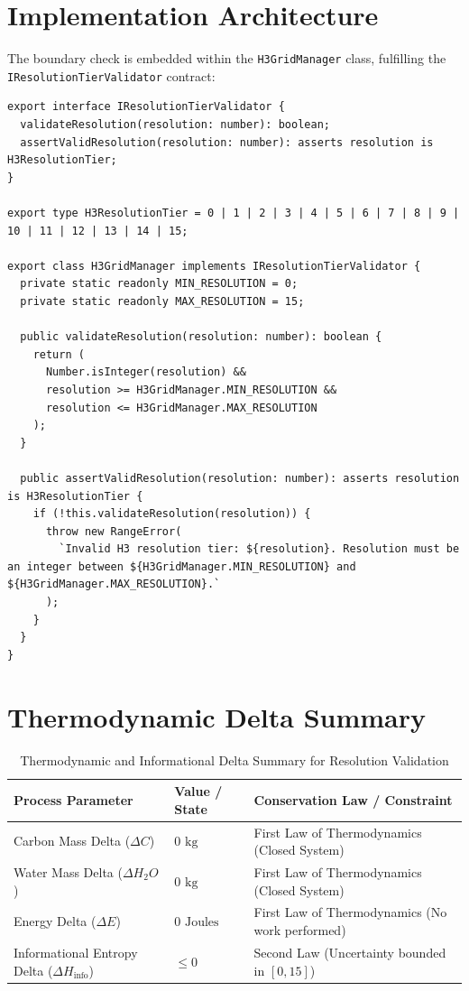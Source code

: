 \documentclass[11pt, a4paper]{article}
\begin{document}
\section{Implementation Architecture}
The boundary check is embedded within the \texttt{H3GridManager} class, fulfilling the \texttt{IResolutionTierValidator} contract:

\begin{verbatim}
export interface IResolutionTierValidator {
  validateResolution(resolution: number): boolean;
  assertValidResolution(resolution: number): asserts resolution is H3ResolutionTier;
}

export type H3ResolutionTier = 0 | 1 | 2 | 3 | 4 | 5 | 6 | 7 | 8 | 9 | 10 | 11 | 12 | 13 | 14 | 15;

export class H3GridManager implements IResolutionTierValidator {
  private static readonly MIN_RESOLUTION = 0;
  private static readonly MAX_RESOLUTION = 15;

  public validateResolution(resolution: number): boolean {
    return (
      Number.isInteger(resolution) &&
      resolution >= H3GridManager.MIN_RESOLUTION &&
      resolution <= H3GridManager.MAX_RESOLUTION
    );
  }

  public assertValidResolution(resolution: number): asserts resolution is H3ResolutionTier {
    if (!this.validateResolution(resolution)) {
      throw new RangeError(
        `Invalid H3 resolution tier: ${resolution}. Resolution must be an integer between ${H3GridManager.MIN_RESOLUTION} and ${H3GridManager.MAX_RESOLUTION}.`
      );
    }
  }
}
\end{verbatim}

\section{Thermodynamic Delta Summary}

\begin{table}[htbp]
\centering
\caption{Thermodynamic and Informational Delta Summary for Resolution Validation}
\label{tab:thermo_delta}
\begin{tabular}{lll}
\toprule
\textbf{Process Parameter} & \textbf{Value / State} & \textbf{Conservation Law / Constraint} \\
\midrule
Carbon Mass Delta ($\Delta C$) & $0 \text{ kg}$ & First Law of Thermodynamics (Closed System) \\
Water Mass Delta ($\Delta H_2O$) & $0 \text{ kg}$ & First Law of Thermodynamics (Closed System) \\
Energy Delta ($\Delta E$) & $0 \text{ Joules}$ & First Law of Thermodynamics (No work performed) \\
Informational Entropy Delta ($\Delta H_{\text{info}}$) & $\le 0$ & Second Law (Uncertainty bounded in $[0, 15]$) \\
\bottomrule
\end{tabular}
\end{table}
\end{document}
